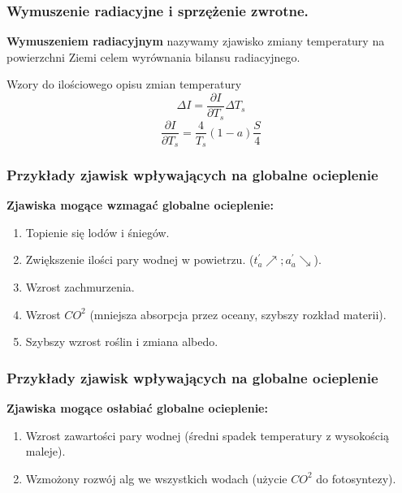 \documentclass{beamer}
\begin{document}
\begin{frame}
	\frametitle{Wymuszenie radiacyjne i sprzężenie zwrotne.}
	\textbf{Wymuszeniem radiacyjnym} nazywamy zjawisko zmiany temperatury na powierzchni Ziemi celem wyrównania bilansu radiacyjnego. 
	\begin{block}{Wzory do ilościowego opisu zmian temperatury}
		\[\Delta I = \frac{\partial I}{\partial T_s}\Delta T_s
		\]
		\[\frac{\partial I}{\partial T_s} = \frac{4}{T_s}(1-a)\frac{S}{4}
		\]
		
	\end{block}
\end{frame}


\begin{frame}
	\frametitle{Przykłady zjawisk wpływających na globalne ocieplenie}

	\textbf{Zjawiska mogące wzmagać globalne ocieplenie:}
	\begin{enumerate}
		\item Topienie się lodów i śniegów.
		
		\item Zwiększenie ilości pary wodnej w powietrzu. 
		($t_a^{'}\nearrow; a_a^{'}\searrow$).
		
		\item Wzrost zachmurzenia.
		
		\item Wzrost $CO^2$ (mniejsza absorpcja przez oceany,
		szybszy rozkład materii).
		
		\item Szybszy wzrost roślin i zmiana albedo.

	\end{enumerate}

\end{frame}


\begin{frame}
	\frametitle{Przykłady zjawisk wpływających na globalne ocieplenie}
	
	\textbf{Zjawiska mogące osłabiać globalne ocieplenie:}
	
	\begin{enumerate}
		
		\item Wzrost zawartości pary wodnej (średni spadek temperatury
		z wysokością maleje).
		
		\item Wzmożony rozwój alg we wszystkich wodach (użycie $CO^2$ 
		do fotosyntezy).
		
	\end{enumerate}
	
\end{frame}
\end{document}
